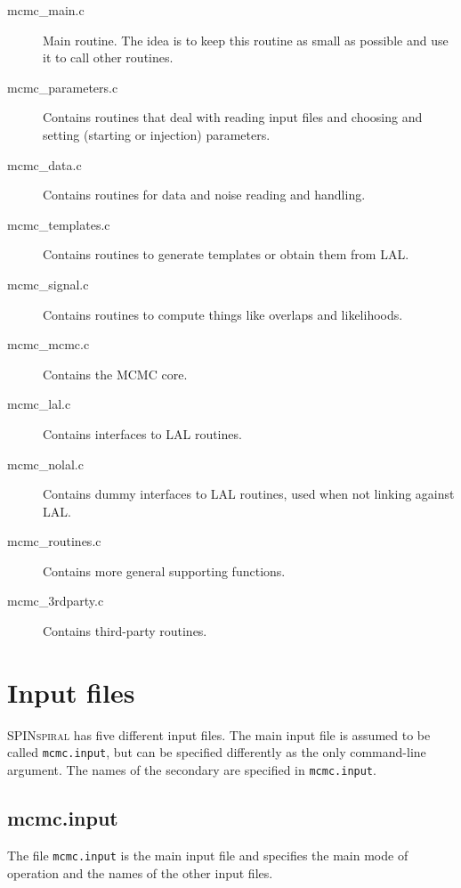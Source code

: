 \documentclass[10pt]{article}
\begin{document}
\begin{description}
\item[mcmc\_main.c] Main routine. The idea is to keep this routine as small as possible and use it to call other routines.
\item[mcmc\_parameters.c] Contains routines that deal with reading input files and choosing and setting (starting or injection) parameters.
\item[mcmc\_data.c] Contains routines for data and noise reading and handling.
\item[mcmc\_templates.c] Contains routines to generate templates or obtain them from LAL.
\item[mcmc\_signal.c] Contains routines to compute things like overlaps and likelihoods.
\item[mcmc\_mcmc.c] Contains the MCMC core.
\item[mcmc\_lal.c] Contains interfaces to LAL routines.
\item[mcmc\_nolal.c] Contains dummy interfaces to LAL routines, used when not linking against LAL.
\item[mcmc\_routines.c] Contains more general supporting functions.
\item[mcmc\_3rdparty.c] Contains third-party routines.
\end{description}


















\pagebreak
\section{Input files}

\textsc{SPINspiral} has five different input files.  The main input file is assumed to be called
\texttt{mcmc.input}, but can be specified differently as the only command-line argument.
The names of the secondary are specified in \texttt{mcmc.input}.


\subsection{mcmc.input}

The file \texttt{mcmc.input} is the main input file and specifies the main mode of operation 
and the names of the other input files.
\end{document}
